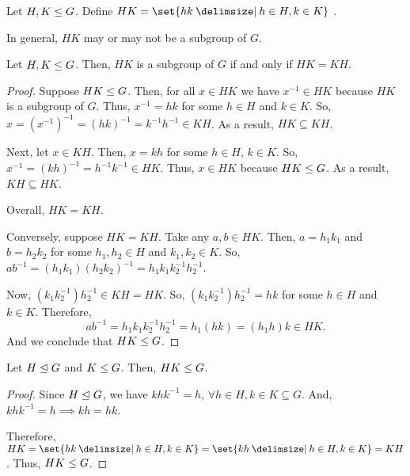 \documentclass[11pt]{penrose}
\begin{document}
\begin{ndfn}
    Let $H, K \mathrel{\leq} G$. Define $HK = \set{hk \st h \in H, k \in K}$ .
\end{ndfn}

In general, $HK$ may or may not be a subgroup of $G$.

\begin{nthm}
    Let $H, K \mathrel{\leq} G$. Then, $HK$ is a subgroup of $G$ if and only if $HK = KH$.
\end{nthm}
\begin{proof}
    Suppose $HK \mathrel{\leq} G$. Then, for all $x \in HK$ we have $x^{-1} \in HK$ because $HK$ is a subgroup of $G$. Thus, $x^{-1} = hk$ for some $h \in H$ and $k \in K$. So, $x = (x^{-1})^{-1} = (hk)^{-1} = k^{-1} h^{-1} \in KH$. As a result, $HK \subseteq KH$.

    Next, let $x \in KH$. Then, $x = kh$ for some $h \in H$, $k \in K$. So, $x^{-1} = (kh)^{-1} = h^{-1} k^{-1} \in HK$. Thus, $x \in HK$ because $HK \mathrel{\leq} G$. As a result, $KH \subseteq HK$.

    Overall, $HK = KH$.

    Conversely, suppose $HK = KH$. Take any $a, b \in HK$. Then, $a = h_{1} k_{1}$ and $b = h_{2} k_{2}$ for some $h_{1}, h_{2} \in H$ and $k_{1}, k_{2} \in K$. So, $a b^{-1} = (h_{1} k_{1}) (h_{2} k_{2})^{-1} = h_{1} k_{1} k_{2}^{-1} h_{2}^{-1}$.

    Now, $(k_{1} k_{2}^{-1}) h_{2}^{-1} \in KH = HK$. So, $(k_{1} k_{2}^{-1}) h_{2}^{-1} = hk$ for some $h \in H$ and $k \in K$. Therefore,
    \begin{equation*}
        a b^{-1}
        = h_{1} k_{1} k_{2}^{-1} h_{2}^{-1}
        = h_{1} (h k)
        = (h_{1} h) k
        \in HK.
    \end{equation*}
    And we conclude that $HK \mathrel{\leq} G$.
\end{proof}

\begin{nthm}\label{thm:normal-product-subgroup}
    Let $H \mathrel{\trianglelefteq} G$ and $K \mathrel{\leq} G$. Then, $HK \mathrel{\leq} G$.
\end{nthm}
\begin{proof}
    Since $H \mathrel{\trianglelefteq} G$, we have $khk^{-1} = h$, $\forall h \in H, k \in K \subseteq G$. And, $khk^{-1} = h \implies kh = hk$.

    Therefore, $HK = \set{hk \st h \in H, k \in K} = \set{kh \st h \in H, k \in K} = KH$.
    Thus, $HK \mathrel{\leq} G$.
\end{proof}
\end{document}
